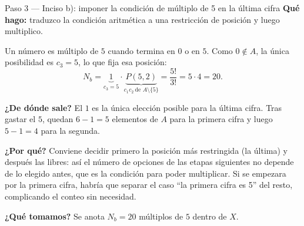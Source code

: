 \documentclass[11pt]{article}
\begin{document}
\begin{paso}{Paso 3 --- Inciso b): imponer la condición de múltiplo de 5 en la última cifra}
\textbf{Qué hago:} traduzco la condición aritmética a una restricción de posición y luego multiplico.

Un número es múltiplo de $5$ cuando termina en $0$ o en $5$. Como $0\notin A$, la única posibilidad es $c_3=5$, lo que fija esa posición:
\[
  N_b = \underbrace{1}_{c_3=5}\cdot \underbrace{P(5,2)}_{c_1c_2\ \text{de }A\setminus\{5\}} = \frac{5!}{3!} = 5\cdot 4 = 20 .
\]

\textbf{¿De dónde sale?} El $1$ es la única elección posible para la última cifra. Tras gastar el $5$, quedan $6-1=5$ elementos de $A$ para la primera cifra y luego $5-1=4$ para la segunda.

\textbf{¿Por qué?} Conviene decidir primero la posición más restringida (la última) y después las libres: así el número de opciones de las etapas siguientes no depende de lo elegido antes, que es la condición para poder multiplicar. Si se empezara por la primera cifra, habría que separar el caso ``la primera cifra es 5'' del resto, complicando el conteo sin necesidad.

\textbf{¿Qué tomamos?} Se anota $N_b=20$ múltiplos de $5$ dentro de $X$.
\end{paso}
\end{document}

